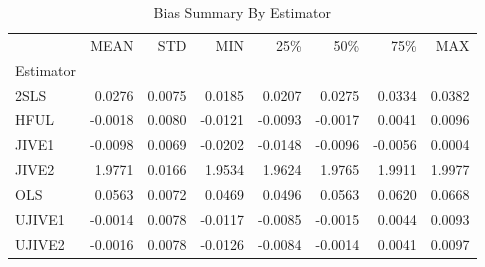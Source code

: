 \begin{table}[ht]
\centering
\caption{Bias Summary By Estimator}
\begin{tabular}{lrrrrrrr}
\toprule
 & MEAN & STD & MIN & 25\% & 50\% & 75\% & MAX \\
Estimator &  &  &  &  &  &  &  \\
\midrule
2SLS & 0.0276 & 0.0075 & 0.0185 & 0.0207 & 0.0275 & 0.0334 & 0.0382 \\
HFUL & -0.0018 & 0.0080 & -0.0121 & -0.0093 & -0.0017 & 0.0041 & 0.0096 \\
JIVE1 & -0.0098 & 0.0069 & -0.0202 & -0.0148 & -0.0096 & -0.0056 & 0.0004 \\
JIVE2 & 1.9771 & 0.0166 & 1.9534 & 1.9624 & 1.9765 & 1.9911 & 1.9977 \\
OLS & 0.0563 & 0.0072 & 0.0469 & 0.0496 & 0.0563 & 0.0620 & 0.0668 \\
UJIVE1 & -0.0014 & 0.0078 & -0.0117 & -0.0085 & -0.0015 & 0.0044 & 0.0093 \\
UJIVE2 & -0.0016 & 0.0078 & -0.0126 & -0.0084 & -0.0014 & 0.0041 & 0.0097 \\
\bottomrule
\end{tabular}
\end{table}
